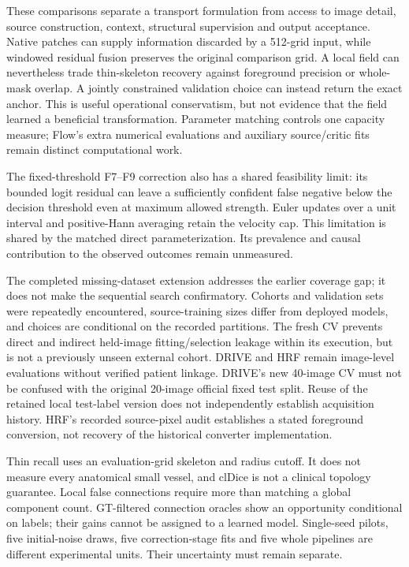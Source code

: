 \documentclass[jimaging,article,submit,pdftex,moreauthors]{Definitions/mdpi}
\begin{document}
These comparisons separate a transport formulation from access to image detail,
source construction, context, structural supervision and output acceptance.
Native patches can supply information discarded by a 512-grid input, while
windowed residual fusion preserves the original comparison grid. A local field
can nevertheless trade thin-skeleton recovery against foreground precision or
whole-mask overlap. A jointly constrained validation choice can instead return
the exact anchor. This is useful operational conservatism, but not evidence that
the field learned a beneficial transformation. Parameter matching controls one
capacity measure; Flow's extra numerical evaluations and auxiliary source/critic
fits remain distinct computational work.

The fixed-threshold F7--F9 correction also has a shared feasibility limit:
its bounded logit residual can leave a sufficiently confident false negative
below the decision threshold even at maximum allowed strength. Euler updates
over a unit interval and positive-Hann averaging retain the velocity cap.
This limitation is shared by the matched direct parameterization. Its
prevalence and causal contribution to the observed outcomes remain unmeasured.

The completed missing-dataset extension addresses the earlier coverage gap; it
does not make the sequential search confirmatory. Cohorts and validation sets
were repeatedly encountered, source-training sizes differ from deployed models,
and choices are conditional on the recorded partitions. The fresh CV prevents
direct and indirect held-image fitting/selection leakage within its execution,
but is not a previously unseen external cohort. DRIVE and HRF remain image-level
evaluations without verified patient linkage. DRIVE's new 40-image CV must not be
confused with the original 20-image official fixed test split. Reuse of the
retained local test-label version does not independently establish acquisition
history. HRF's recorded source-pixel audit establishes a stated foreground
conversion, not recovery of the historical converter implementation.

Thin recall uses an evaluation-grid skeleton and radius cutoff. It does not
measure every anatomical small vessel, and clDice is not a clinical topology
guarantee. Local false connections require more than matching a global component
count. GT-filtered connection oracles show an opportunity conditional on labels;
their gains cannot be assigned to a learned model. Single-seed pilots, five
initial-noise draws, five correction-stage fits and five whole pipelines are
different experimental units. Their uncertainty must remain separate.
\end{document}
